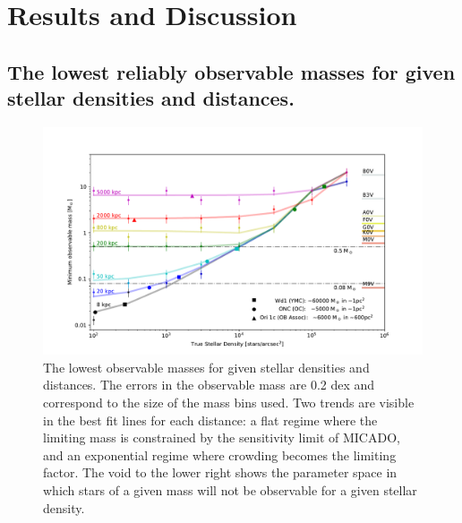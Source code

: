 \section{Results and Discussion}
\label{sec:results}

\subsection{The lowest reliably observable masses for given stellar densities
and distances.}

\begin{figure}

    \centering
    \includegraphics[width=\textwidth]{images/old_trusted_mass.pdf}

    \caption{The lowest observable masses for given stellar densities and distances. The errors in the observable mass are 0.2 dex and correspond to the size of the mass bins used.   Two trends are visible in the best fit lines for each distance: a flat regime where the limiting mass is constrained by the sensitivity limit of MICADO, and an exponential regime where crowding becomes the limiting factor. The void to the lower right shows the parameter space in which stars of a given mass will not be observable for a given stellar density. 
    }
    \label{fig:trusted_mass}
\end{figure}

